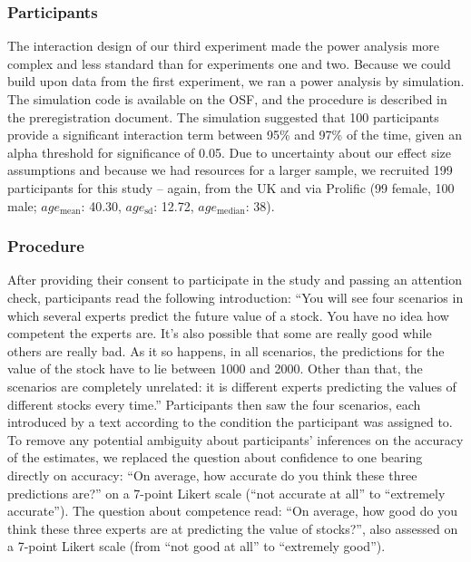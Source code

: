 \documentclass[
  doc,floatsintext]{apa6}
\begin{document}
\subsubsection{Participants}\label{participants-2}

The interaction design of our third experiment made the power analysis more complex and less standard than for experiments one and two. Because we could build upon data from the first experiment, we ran a power analysis by simulation. The simulation code is available on the OSF, and the procedure is described in the preregistration document. The simulation suggested that 100 participants provide a significant interaction term between 95\% and 97\% of the time, given an alpha threshold for significance of 0.05. Due to uncertainty about our effect size assumptions and because we had resources for a larger sample, we recruited 199 participants for this study -- again, from the UK and via Prolific (99 female, 100 male; \(age_\text{mean}\): 40.30, \(age_\text{sd}\): 12.72, \(age_\text{median}\): 38).

\subsubsection{Procedure}\label{procedure-1}

After providing their consent to participate in the study and passing an attention check, participants read the following introduction: ``You will see four scenarios in which several experts predict the future value of a stock. You have no idea how competent the experts are. It's also possible that some are really good while others are really bad. As it so happens, in all scenarios, the predictions for the value of the stock have to lie between 1000 and 2000. Other than that, the scenarios are completely unrelated: it is different experts predicting the values of different stocks every time.'' Participants then saw the four scenarios, each introduced by a text according to the condition the participant was assigned to. To remove any potential ambiguity about participants' inferences on the accuracy of the estimates, we replaced the question about confidence to one bearing directly on accuracy: ``On average, how accurate do you think these three predictions are?'' on a 7-point Likert scale (``not accurate at all'' to ``extremely accurate''). The question about competence read: ``On average, how good do you think these three experts are at predicting the value of stocks?'', also assessed on a 7-point Likert scale (from ``not good at all'' to ``extremely good'').
\end{document}
